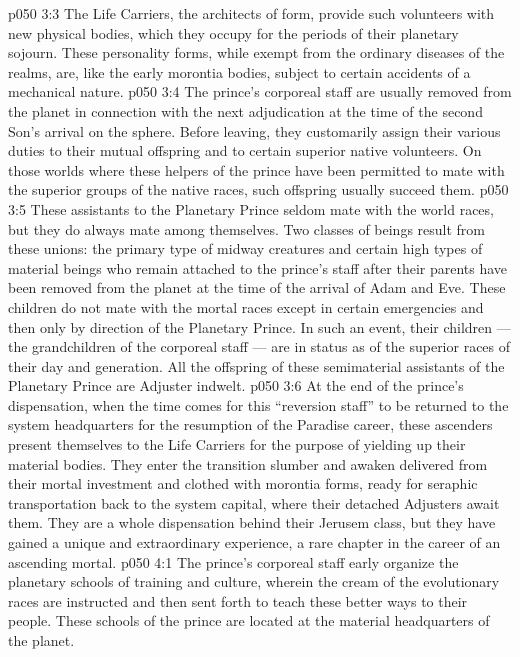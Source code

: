 \vs p050 3:3 The Life Carriers, the architects of form, provide such volunteers with new physical bodies, which they occupy for the periods of their planetary sojourn. These personality forms, while exempt from the ordinary diseases of the realms, are, like the early morontia bodies, subject to certain accidents of a mechanical nature.
\vs p050 3:4 \pc The prince’s corporeal staff are usually removed from the planet in connection with the next adjudication at the time of the second Son’s arrival on the sphere. Before leaving, they customarily assign their various duties to their mutual offspring and to certain superior native volunteers. On those worlds where these helpers of the prince have been permitted to mate with the superior groups of the native races, such offspring usually succeed them.
\vs p050 3:5 These assistants to the Planetary Prince seldom mate with the world races, but they do always mate among themselves. Two classes of beings result from these unions: the primary type of midway creatures and certain high types of material beings who remain attached to the prince’s staff after their parents have been removed from the planet at the time of the arrival of Adam and Eve. These children do not mate with the mortal races except in certain emergencies and then only by direction of the Planetary Prince. In such an event, their children --- the grandchildren of the corporeal staff --- are in status as of the superior races of their day and generation. All the offspring of these semimaterial assistants of the Planetary Prince are Adjuster indwelt.
\vs p050 3:6 At the end of the prince’s dispensation, when the time comes for this “reversion staff” to be returned to the system headquarters for the resumption of the Paradise career, these ascenders present themselves to the Life Carriers for the purpose of yielding up their material bodies. They enter the transition slumber and awaken delivered from their mortal investment and clothed with morontia forms, ready for seraphic transportation back to the system capital, where their detached Adjusters await them. They are a whole dispensation behind their Jerusem class, but they have gained a unique and extraordinary experience, a rare chapter in the career of an ascending mortal.
\vs p050 4:1 The prince’s corporeal staff early organize the planetary schools of training and culture, wherein the cream of the evolutionary races are instructed and then sent forth to teach these better ways to their people. These schools of the prince are located at the material headquarters of the planet.
